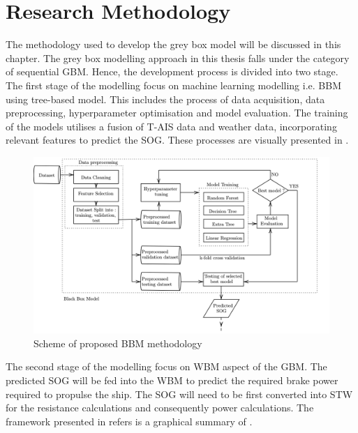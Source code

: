 \chapter{Research Methodology} \label{chp:method}

The methodology used to develop the grey box model will be discussed in this chapter. The grey box modelling approach in this thesis falls under the category of sequential GBM. Hence, the development process is divided into two stage. The first stage of the modelling focus on machine learning modelling i.e. BBM using tree-based model. This includes the process of data acquisition, data preprocessing, hyperparameter optimisation and model evaluation. The training of the models utilises a fusion of T-AIS data and weather data, incorporating relevant features to predict the SOG. These processes are visually presented in .\\

\begin{figure}[h]
    \centering
        \includegraphics[width=\textwidth]{02_figures/flowmethod.png}
        \caption{Scheme of proposed BBM methodology}
        \label{fig:flowchart_BBM}
\end{figure}

The second stage of the modelling focus on WBM aspect of the GBM. The predicted SOG will be fed into the WBM to predict the required brake power required to propulse the ship. The SOG will need to be first converted into STW for the resistance calculations and consequently power calculations. The framework presented in  refers is a graphical summary of . 

